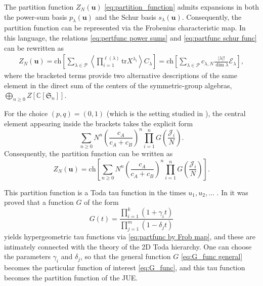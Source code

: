 \documentclass{article}
\newcommand{\tr}{\mathrm{tr}}
\theoremstyle{plain}
\theoremstyle{definition}
\numberwithin{equation}{section}
\begin{document}
The partition function $Z_N(\mathbf{u})$ \eqref{eq:partition_function} admits expansions in both the power-sum basis $p_\lambda(\mathbf{u})$ and the Schur basis $s_\lambda(\mathbf{u})$. Consequently, the partition function can be represented via the Frobenius characteristic map. In this language, the relations \eqref{eq:pertfunc power sums} and \eqref{eq:partfunc schur func} can be rewritten as
\begin{equation}
    \label{eq:partfunc Frob map general}
    \begin{aligned}
        Z_N(\mathbf{u}) = \mathrm{ch}\left[ \sum_{\lambda \in \mathcal{P}} \left\langle \prod_{i=1}^{\ell(\lambda)} \tr X^{\lambda_i}\right\rangle C_\lambda \right] = \mathrm{ch}\left[ \sum_{\lambda \in \mathcal{P}} c_{\lambda, N} \frac{|\lambda|!}{\dim \lambda}\mathcal{E}_\lambda \right],
    \end{aligned}
\end{equation}
where the bracketed terms provide two alternative descriptions of the same element in the direct sum of the centers of the symmetric-group algebras, $\bigoplus_{n \ge 0} Z[\mathbb{C}[\mathfrak{S}_n]]$.

For the choice $(p,q)=(0,1)$ (which is the setting studied in \cite{gisonni2021jacobi}), the central element appearing inside the brackets takes the explicit form
\begin{equation}
    \label{eq:central element}
    \sum_{n\ge 0} N^{n} \left(\frac{c_A}{c_A + c_B}\right)^{n} \prod_{i=1}^{n} G\left( \frac{\mathcal{J}_i}{N}\right).
\end{equation}
Consequently, the partition function can be written as
\begin{equation}
    \label{eq:partfunc by Frob map}
    Z_N(\mathbf{u}) = \mathrm{ch} \left[\sum_{n\ge 0} N^{n} \left(\frac{c_A}{c_A + c_B}\right)^{n} \prod_{i=1}^{n} G\left( \frac{\mathcal{J}_i}{N}\right)\right].
\end{equation}

This partition function is a Toda tau function in the times $u_1, u_2,\dots$ \cite{AvM1995, AvM2001, Deift}. In \cite{harnad2015hypergeometric} it was proved that a function $G$ of the form
\begin{equation}
    \label{eq:G_func general}
    G(t) = \frac{\prod_{i=1}^k(1+\gamma_i t)}{\prod_{j=1}^m (1-\delta_j t)}
\end{equation}
yields hypergeometric tau functions via \eqref{eq:partfunc by Frob map}, and these are intimately connected with the theory of the 2D Toda hierarchy. One can choose the parameters $\gamma_i$ and $\delta_j$, so that the general function $G$ \eqref{eq:G_func general} becomes the particular function of interest \eqref{eq:G_func}, and this tau function becomes the partition function of the JUE. 
\end{document}
